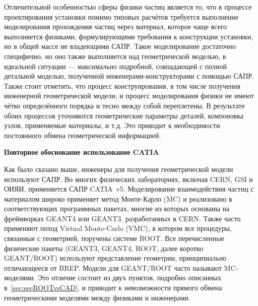 Отличительной особенностью сферы физики частиц является то, что в процессе проектирования установки помимо типовых расчётов требуется выполнение моделирования прохождения частиц через материал, которое чаще всего выполняется физиками, формулирующими требования к конструкции установки, но в общей массе не владеющими САПР. Такое моделирование достаточно специфично, но оно также выполняется над геометрической моделью, в идеальной ситуации --- максимально подробной, совпадающей с полной детальной моделью, полученной инженерами-конструкторами с помощью САПР. Также стоит отметить, что процесс конструирования, в том числе получения инженерной геометрической модели, и процесс моделирования физики не имеют чётко определённого порядка и тесно между собой переплетены. В результате обоих процессов уточняются геометрические параметры деталей, компоновка узлов, применяемые материалы, и т.д. Это приводит к необходимости постоянного обмена геометрической информацией.

\textbf{Повторное обоснование использование CATIA}

Как было сказано выше, инженеры для получения геометрической модели используют САПР. Во многих физических лабораториях, включая CERN, GSI и ОИЯИ, применяется САПР CATIA~v5. Моделирование взаимодействия частиц с материалом широко применяет метод Монте-Карло (MC) и реализовано в соответствующих программных пакетах, многие из которых основаны на фреймворках GEANT4 или GEANT3, разработанных в CERN. Также часто применяют поход Virtual Monte-Carlo (VMC), в котором все процедуры, связанные с геометрией, поручены системе ROOT. Все перечисленные физические пакеты (GEANT3, GEANT4, ROOT, далее коротко GEANT/ROOT) используют представление геометрии, принципиально отличающееся от BREP. Модели для GEANT/ROOT часто называют MC-моделями. Это отличие состоит из двух пунктов, подробно описанных в~\ref{sec:secROOTvsCAD}, и приводит к невозможности прямого обмена геометрическими моделями между физиками и инженерами.

